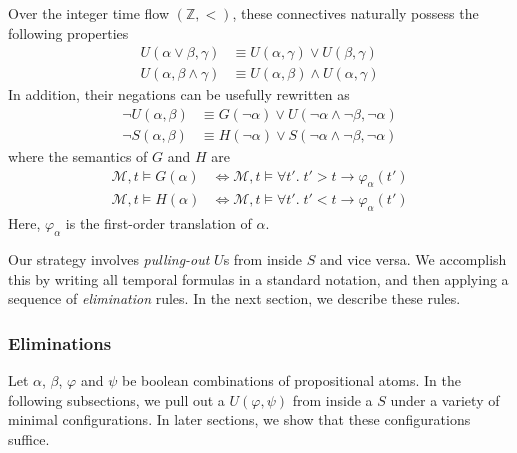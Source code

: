 \documentclass[a4paper,UKenglish,cleveref, autoref, thm-restate]{lipics-v2021}
\begin{document}
Over the integer time flow $(\mathbb{Z}, <)$, these connectives naturally possess the following properties
\begin{equation}
    \label{eq:or-and-S-U}
    \begin{aligned}
        U(\alpha \lor \beta, \gamma) &\equiv U(\alpha, \gamma) \lor U(\beta, \gamma)\\
        U(\alpha, \beta \land \gamma) &\equiv U(\alpha, \beta) \land U(\alpha, \gamma)
    \end{aligned}
\end{equation}
In addition, their negations can be usefully rewritten as
\begin{equation*}
    \begin{aligned}
        \lnot U(\alpha, \beta) &\equiv G(\lnot \alpha) \lor U(\lnot \alpha \land \lnot \beta, \lnot \alpha) \\
        \lnot S(\alpha, \beta) &\equiv H(\lnot \alpha) \lor S(\lnot \alpha \land \lnot \beta, \lnot \alpha)
    \end{aligned}
\end{equation*}
where the semantics of $G$ and $H$ are
\begin{equation*}
    \begin{aligned}
        \mathcal{M}, t \vDash G(\alpha) &\Longleftrightarrow \mathcal{M}, t \vDash \forall t'.\; t' > t \to \varphi_\alpha(t') \\
        \mathcal{M}, t \vDash H(\alpha) &\Longleftrightarrow \mathcal{M}, t \vDash \forall t'.\; t' < t \to \varphi_\alpha(t')
    \end{aligned}
\end{equation*}
Here, $\varphi_\alpha$ is the first-order translation of $\alpha$.

Our strategy involves \textit{pulling-out} $U$s from inside $S$ and vice versa. We accomplish this by writing all temporal formulas in a standard notation, and then applying a sequence of \textit{elimination} rules. In the next section, we describe these rules.

\subsubsection{Eliminations}
\label{sec:eliminations-linear}

Let $\alpha$, $\beta$, $\varphi$ and $\psi$ be boolean combinations of propositional atoms. In the following subsections, we pull out a $U(\varphi, \psi)$ from inside a $S$ under a variety of minimal configurations. In later sections, we show that these configurations suffice.
\end{document}
